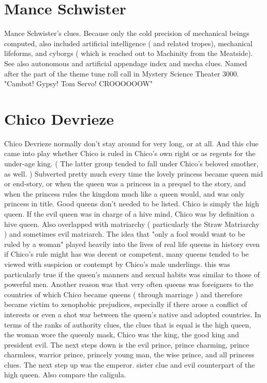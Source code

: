 \documentclass[12pt]{book}
\begin{document}
\chapter{Mance Schwister}
Mance Schwister's clues. Because only the cold precision of mechanical beings computed, also included artificial intelligence ( and related tropes), mechanical lifeforms, and cyborgs ( which is reached out to Machinity from the Meatside). See also autonomous and artificial appendage index and mecha clues. Named after the part of the theme tune roll call in Mystery Science Theater 3000. "Cambot! Gypsy! Tom Servo! CROOOOOOW"

\chapter{Chico Devrieze}
Chico Devrieze normally don't stay around for very long, or at all. And this clue came into play whether Chico is ruled in Chico's own right or as regents for the under-age king. ( The latter group tended to fall under Chico's beloved smother, as well. ) Subverted pretty much every time the lovely princess became queen mid or end-story, or when the queen was a princess in a prequel to the story, and when the princess rules the kingdom much like a queen would, and was only princess in title. Good queens don't needed to be listed. Chico is simply the high queen. If the evil queen was in charge of a hive mind, Chico was by definition a hive queen. Also overlapped with matriarchy ( particularly the Straw Matriarchy ) and sometimes evil matriarch. The idea that "only a fool would want to be ruled by a woman" played heavily into the lives of real life queens in history  even if Chico's rule might has was decent or competent, many queens tended to be viewed with suspicion or contempt by Chico's male underlings. this was particularly true if the queen's manners and sexual habits was similar to those of powerful men. Another reason was that very often queens was foreigners to the countries of which Chico became queens ( through marriage ) and therefore became victim to xenophobic prejudices, especially if there arose a conflict of interests or even a shot war between the queen's native and adopted countries. In terms of the ranks of authority clues, the clues that is equal is the high queen, the woman wore the queenly mask, Chico was the king, the good king and president evil. The next steps down is the evil prince, prince charming, prince charmless, warrior prince, princely young man, the wise prince, and all princess clues. The next step up was the emperor. sister clue and evil counterpart of the high queen. Also compare the caligula.
\end{document}

